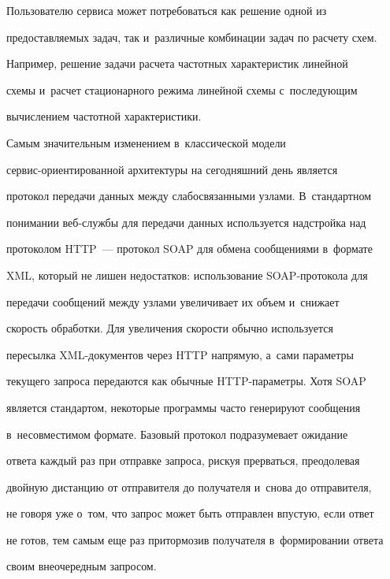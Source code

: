    


   Пользователю сервиса может потребоваться как решение одной из 


пред\-остав\-ля\-емых задач, так и~различные комбинации задач по расчету схем. 


Например, решение задачи расчета частотных характеристик линейной 


схемы и~расчет стационарного режима линейной схемы с~последующим 


вычислением частотной характеристики.


   


     Самым значительным изменением в~классической модели  


сервис-ори\-ен\-ти\-ро\-ван\-ной архитектуры на сегодняшний день является 


протокол передачи данных между слабосвязанными узлами. В~стандартном 


понимании веб-служ\-бы для передачи данных используется надстройка над 


протоколом HTTP~--- протокол SOAP для обмена сообщениями в~формате 


XML, который не лишен недостатков: использование SOAP-про\-то\-ко\-ла для 


передачи сообщений между узлами увеличивает их объем и~снижает 


скорость обработки. Для увеличения скорости обычно используется 


пересылка XML-до\-ку\-мен\-тов через HTTP напрямую, а~сами параметры 


текущего запроса передаются как обычные HTTP-па\-ра\-мет\-ры. Хотя SOAP 


является стандартом, некоторые программы часто генерируют сообщения 


в~несовместимом формате. Базовый протокол подразумевает ожидание 


ответа каждый раз при отправке запроса, рискуя прерваться, преодолевая 


двойную дистанцию от отправителя до получателя и~снова до отправителя, 


не говоря уже о~том, что запрос может быть отправлен впустую, если ответ 


не готов, тем самым еще раз притормозив получателя в~формировании ответа 


своим внеочередным запросом. 


     


